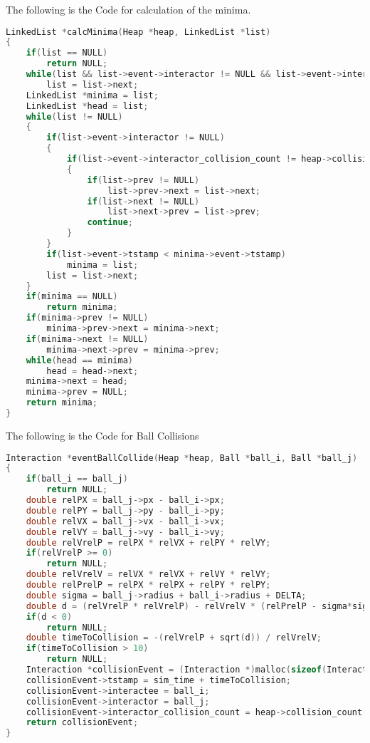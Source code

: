 \documentclass{article}
\begin{document}
The following is the Code for calculation of the minima.
\begin{lstlisting}[language=c, caption=process schedule]
LinkedList *calcMinima(Heap *heap, LinkedList *list)
{
    if(list == NULL)
        return NULL;
    while(list && list->event->interactor != NULL && list->event->interactor_collision_count != heap->collision_count[list->event->interactor->id])
        list = list->next;
    LinkedList *minima = list;
    LinkedList *head = list;
    while(list != NULL)
    {
        if(list->event->interactor != NULL)
        {
            if(list->event->interactor_collision_count != heap->collision_count[list->event->interactor->id])
            {
                if(list->prev != NULL)
                    list->prev->next = list->next;
                if(list->next != NULL)
                    list->next->prev = list->prev;
                continue;
            }
        }
        if(list->event->tstamp < minima->event->tstamp)
            minima = list;
        list = list->next;
    }
    if(minima == NULL)
        return minima;
    if(minima->prev != NULL)
        minima->prev->next = minima->next;
    if(minima->next != NULL)
        minima->next->prev = minima->prev;
    while(head == minima)
        head = head->next;
    minima->next = head;
    minima->prev = NULL;
    return minima;
}
\end{lstlisting}

The following is the Code for Ball Collisions
\begin{lstlisting}[language=c, caption=process schedule]
Interaction *eventBallCollide(Heap *heap, Ball *ball_i, Ball *ball_j)
{
    if(ball_i == ball_j)
        return NULL;
    double relPX = ball_j->px - ball_i->px;
    double relPY = ball_j->py - ball_i->py;
    double relVX = ball_j->vx - ball_i->vx;
    double relVY = ball_j->vy - ball_i->vy;
    double relVrelP = relPX * relVX + relPY * relVY;
    if(relVrelP >= 0)
        return NULL;
    double relVrelV = relVX * relVX + relVY * relVY;
    double relPrelP = relPX * relPX + relPY * relPY;
    double sigma = ball_j->radius + ball_i->radius + DELTA;
    double d = (relVrelP * relVrelP) - relVrelV * (relPrelP - sigma*sigma);
    if(d < 0)
        return NULL;
    double timeToCollision = -(relVrelP + sqrt(d)) / relVrelV;
    if(timeToCollision > 10)
        return NULL;
    Interaction *collisionEvent = (Interaction *)malloc(sizeof(Interaction));
    collisionEvent->tstamp = sim_time + timeToCollision;
    collisionEvent->interactee = ball_i;
    collisionEvent->interactor = ball_j;
    collisionEvent->interactor_collision_count = heap->collision_count[ball_j->id];
    return collisionEvent;
}
\end{lstlisting}
\end{document}
